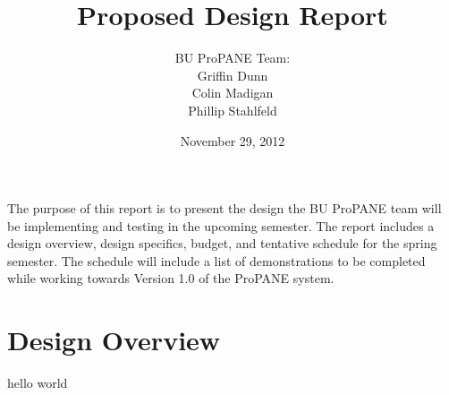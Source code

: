 \documentclass[]{article}
\begin{document}
	\begin{titlepage}



		\title{\textbf{Proposed Design Report}}
		\author{BU ProPANE Team:\\Griffin Dunn\\Colin Madigan\\Phillip Stahlfeld}
		\date{November 29, 2012}
		\maketitle



		\noindent
		The purpose of this report is to present the design the BU ProPANE team will be implementing and testing in the upcoming semester. The report includes a design overview, design specifics, budget, and tentative schedule for the spring semester. The schedule will include a list of demonstrations to be completed while working towards Version 1.0 of the ProPANE system. 
		\thispagestyle{empty}
		
		
		
	\end{titlepage}
	
	
	
	
	\tableofcontents
	\newpage
	
	\setcounter{page}{1}
	\thispagestyle{empty}
	
	\section{Design Overview}
		hello world
		
			
\end{document}
